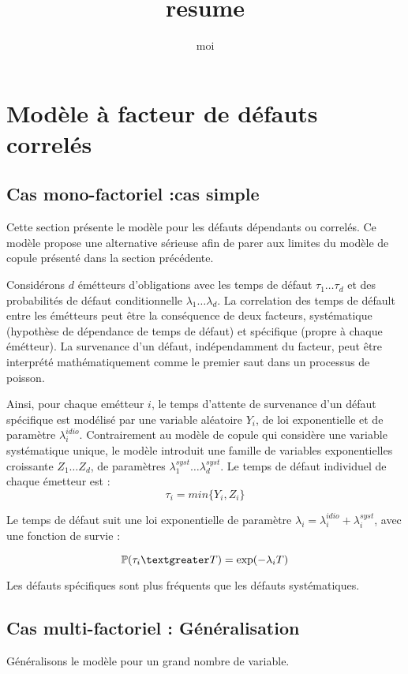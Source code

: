 \documentclass[10pt,a4paper]{article}
\author{moi}
\title{resume}
\begin{document}
	
	\section{Modèle à facteur de défauts correlés}
	
	\subsection{Cas mono-factoriel :cas simple}
	
	Cette section présente le modèle pour les défauts dépendants ou correlés. Ce modèle propose une alternative sérieuse afin de parer aux limites du modèle de copule présenté dans la section précédente.
	
	Considérons $d$  émétteurs d'obligations avec les temps de défaut $ \tau_1 \ldots \tau_d $ et des probabilités de défaut conditionnelle $ \lambda_1 \ldots \lambda_d $. La correlation des temps de défault  entre les émétteurs peut être la conséquence de deux facteurs, systématique (hypothèse de dépendance de temps de défaut) et spécifique (propre à chaque émétteur). La survenance d'un défaut, indépendamment du facteur, peut être interprété mathématiquement comme le premier saut dans un processus de poisson.
	
	Ainsi, pour chaque emétteur $ i $, le temps d'attente de survenance d'un défaut spécifique est modélisé par une variable aléatoire $ Y_i $, de loi exponentielle et de paramètre $ \lambda_i^{idio} $. Contrairement au modèle de copule qui considère une variable systématique unique, le modèle introduit une famille de variables exponentielles croissante $ Z_1 \ldots Z_d $, de paramètres $ \lambda_1^{syst} \ldots \lambda_d^{syst} $. Le temps de défaut individuel de chaque émetteur est : 
	$$ \tau_i = min\{ Y_i, Z_i\} $$
	
	Le temps de défaut suit une loi exponentielle de paramètre $ \lambda_i = \lambda_i^{idio} + \lambda_i^{syst}  $, avec une fonction de survie :
	
	$$\mathbb{P}( \tau_i \textgreater T) = \exp(-\lambda_i T) $$
	
	Les défauts spécifiques sont plus fréquents que les défauts systématiques.
	
	\subsection{Cas multi-factoriel : Généralisation}
	
	Généralisons le modèle pour un grand nombre de variable.
	
\end{document}
